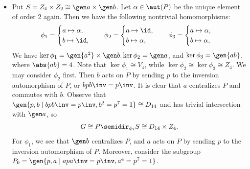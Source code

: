 \begin{solenum}
\begin{itemize}
\[        \]
        Note that $\ker\phi_1 = \gen b \times \gen c$, $\ker\phi_2 = \gen{ab, c}$, and $\ker\phi_3 = \gen{ab, ac}$.
        Note that these are all isomorphic to $V_4$, hence the resulting semidirect products are isomorphic by .
        Without loss of generality, consider $\phi_1$.
        Then $a$ acts on $P$ by sending $p$ to the inversion automorphism of $P$, or $apa\inv = p\inv$.
        It is clear that $b$ and $c$ centralize $P$ and commute with $a$.
        Observe that $\gen{p, a \mid apa\inv = p\inv, a^2 = p^7 = 1} \cong D_{14}$ and has trivial intersection with $\gen b \times \gen c$, so
        \[
        	G \cong P \semidir_{\phi_1} S \cong D_{14} \times Z_2 \times Z_2.
        \]
        \item Put $S = Z_4 \times Z_2 \cong \gen a \times \gen b$.
        Let $\alpha \in \aut(P)$ be the unique element of order 2 again.
        Then we have the following nontrivial homomorphisms:
        \[
        	\phi_1 =
            \begin{cases}
                a \mapsto \alpha, \\
                b \mapsto \id,
            \end{cases} \quad
            \phi_2 = 
            \begin{cases}
                a \mapsto \id, \\
                b \mapsto \alpha,
            \end{cases} \quad
            \phi_3 =
            \begin{cases}
                a \mapsto \alpha, \\
                b \mapsto \alpha,
            \end{cases}
        \]
        We have $\ker\phi_1 = \gen{a^2} \times \gen b, \ker\phi_2 = \gen a$, and $\ker\phi_3 = \gen{ab}$, where $\abs{ab} = 4$.
        Note that $\ker\phi_1 \cong V_4$, while $\ker\phi_2 \cong \ker\phi_3 \cong Z_4$.
        We may consider $\phi_2$ first.
        Then $b$ acts on $P$ by sending $p$ to the inversion automorphism of $P$, or $bpb\inv = p\inv$.
        It is clear that $a$ centralizes $P$ and commutes with $b$.
        Observe that $\gen{p, b \mid bpb\inv = p\inv, b^2 = p^7 = 1} \cong D_{14}$ and has trivial intersection with $\gen a$, so
        \[
        	G \cong P \semidir_{\phi_2} S \cong D_{14} \times Z_4.
        \]
        For $\phi_1$, we see that $\gen b$ centralizes $P$, and $a$ acts on $P$ by sending $p$ to the inversion automorphism of $P$.
        Moreover, consider the subgroup $P_0 = \gen{p, a \mid apa\inv = p\inv, a^4 = p^7 = 1}$.

\end{itemize}
\end{solenum}
